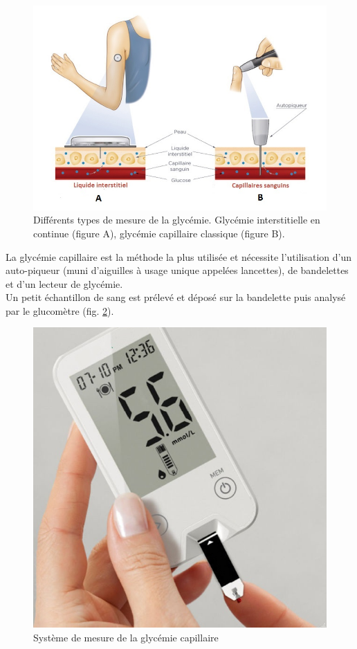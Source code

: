     \begin{figure}[H]
        \centering
        \includegraphics[scale=0.7]{images/glucometreVSfreestyle2.jpg}
        \caption{\label{fig:capillaireVSinterstitiel}Différents types de mesure de la glycémie. Glycémie interstitielle en continue (figure A), glycémie capillaire classique (figure B). }
    \end{figure}
    
    
    La glycémie capillaire est la méthode la plus utilisée et nécessite l'utilisation d'un auto-piqueur (muni d'aiguilles à usage unique appelées lancettes), de bandelettes et d'un lecteur de glycémie. \\
    
    Un petit échantillon de sang est prélevé et déposé sur la bandelette puis analysé par le glucomètre (fig. \ref{fig:glycemieCapillaire}).
    
    \begin{figure}[H]
        \centering
        \includegraphics[scale=0.25]{images/glucometre.jpg}
        \caption{\label{fig:glycemieCapillaire}Système de mesure de la glycémie capillaire}
    \end{figure}


